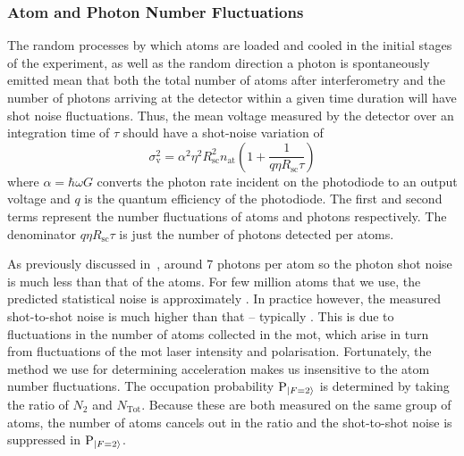 \subsubsection{Atom and Photon Number Fluctuations}
The random processes by which atoms are loaded and cooled in the
initial stages of the experiment, as well as the random direction a
photon is spontaneously emitted mean that both the total number of
atoms after interferometry and the number of photons arriving at the
detector within a given time duration will have shot noise
fluctuations.  
Thus, the mean voltage measured by the detector over an integration
time of $\tau$ should have a shot-noise variation of
\begin{equation}
  \sigma_\text{v}^2 = \alpha^2 \eta^2 R_\text{sc}^2 n_\text{at}\left(1
  + \frac{1}{q \eta R_\text{sc} \tau} \right)
  \label{eq:atom_photon_noise}
\end{equation}
where $\alpha = \hbar \omega G$ converts the photon rate incident on
the photodiode to an output voltage and $q$ is the quantum efficiency
of the photodiode. The first and second terms represent the number
fluctuations of atoms and photons respectively. The denominator $q
\eta R_\text{sc} \tau$ is just the number of photons detected per
atoms. 
\par\noindent
As previously discussed
in~, around 7 photons per atom
so the photon shot noise is much less than that of the atoms. For few
million atoms that we use, the predicted statistical noise is
approximately . In practice however, the
measured shot-to-shot noise is much higher than that --
typically . This is due to fluctuations in the
number of atoms collected in the \ac{mot}, which arise in turn from
fluctuations of the \ac{mot} laser intensity and polarisation.
Fortunately, the method we use for determining acceleration makes us
insensitive to the atom number fluctuations. The occupation probability $\text{P}_{\ket{F=2}}$ is determined by
taking the ratio of
$N_2$ and $N_\text{Tot}$. Because these are both measured on the same
group of atoms, the number of atoms cancels out in the ratio and the
shot-to-shot noise is suppressed in
$\text{P}_{\ket{F=2}}$. 
